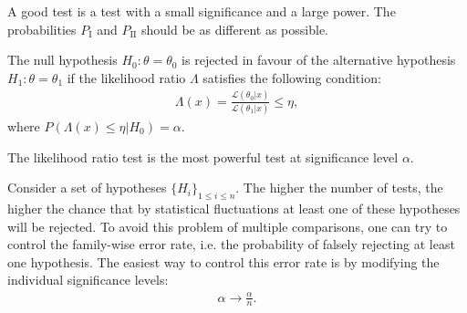{    
    \begin{remark}
        A good test is a test with a small significance and a large power. The probabilities $P_\mathrm{I}$ and $P_\mathrm{II}$ should be as different as possible.
    \end{remark}

    \begin{definition}\label{statistics:likelihood_ratio}
        The null hypothesis $H_0:\theta=\theta_0$ is rejected in favour of the alternative hypothesis $H_1:\theta=\theta_1$ if the likelihood ratio $\Lambda$ satisfies the following condition:
        \begin{gather}
            \Lambda(x) = \frac{\mathcal{L}(\theta_0|x)}{\mathcal{L}(\theta_1|x)}\leq\eta,
        \end{gather}
        where $P(\Lambda(x)\leq\eta|H_0) = \alpha $.
    \end{definition}
    \begin{theorem}\label{statistics:neyman_pearson}
        The likelihood ratio test is the most powerful test at significance level $\alpha$.
    \end{theorem}

    \begin{construct}
        Consider a set of hypotheses $\{H_i\}_{1\leq i\leq n}$. The higher the number of tests, the higher the chance that by statistical fluctuations at least one of these hypotheses will be rejected. To avoid this problem of multiple comparisons, one can try to control the family-wise error rate, i.e. the probability of falsely rejecting at least one hypothesis. The easiest way to control this error rate is by modifying the individual significance levels:
        \begin{gather}
            \alpha\longrightarrow\frac{\alpha}{n}.
        \end{gather}
    \end{construct}

}
